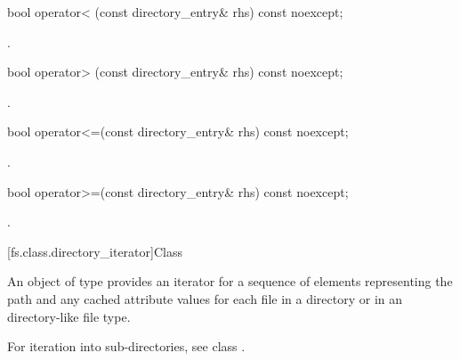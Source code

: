 %
\begin{itemdecl}
bool operator< (const directory_entry& rhs) const noexcept;
\end{itemdecl}

\begin{itemdescr}
\pnum
\returns {}.
\end{itemdescr}

%
\begin{itemdecl}
bool operator> (const directory_entry& rhs) const noexcept;
\end{itemdecl}

\begin{itemdescr}
\pnum
\returns {}.
\end{itemdescr}

%
\begin{itemdecl}
bool operator<=(const directory_entry& rhs) const noexcept;
\end{itemdecl}

\begin{itemdescr}
\pnum
\returns {}.
\end{itemdescr}

%
\begin{itemdecl}
bool operator>=(const directory_entry& rhs) const noexcept;
\end{itemdecl}

\begin{itemdescr}
\pnum
\returns {}.
\end{itemdescr}

[fs.class.directory_iterator]{Class }

%
\pnum
An object of type  provides an iterator for a
sequence of  elements representing the
path and any cached attribute values
for each file in a directory
or in an  directory-like file type.
\begin{note} For iteration into sub-directories, see class .
\end{note}

